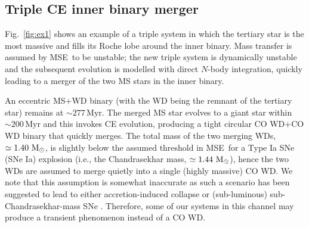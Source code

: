 \documentclass[twocolumn,appendixfloats,tighten]{aastex631}
\def\msun{{\rm\,M_\odot}}
\newcommand{\F}{Fig.}
\newcommand{\myr}{\mathrm{Myr}}
\newcommand{\mse}{\textsc{MSE}}
\begin{document}
\subsection{Triple CE inner binary merger}
\label{sect:ex:1}

\F~\ref{fig:ex1} shows an example of a triple system in which the tertiary star is the most massive and fills its Roche lobe around the inner binary. Mass transfer is assumed by \mse~to be unstable; the new triple system is dynamically unstable and the subsequent evolution is modelled with direct $N$-body integration, quickly leading to a merger of the two MS stars in the inner binary. 

\begin{figure*}
\iftoggle{ApJFigs}{
\texttt{[image: system\_2166\_mobile]}
}{
\texttt{[image: figs/system\_2166\_mobile]}
}
\caption{Mobile diagrams for a system in which unstable tertiary RLOF is followed by a merger in the inner binary system. The merged star, a new MS star, forms a tight binary with the tertiary star (now a WD). The latter evolves into a double WD system that merges into a single WD (the total WD mass before merger is just below the Chandrasekhar mass; a SNe Ia explosion is  assumed not to occur). When applicable, the current mutual inclination between the inner and outer orbits ($i_\mathrm{rel}$) is indicated. Note that the mobiles (black solid lines) are only shown for bound (sub)systems and when the code is in secular integration mode. Directly following (triple) CE, the code switches to direct $N$-body integration, in which case the orbital configuration may not be stable; stars are in this case depicted as in isolation (although they may be actually bound).}
\label{fig:ex1}
\end{figure*}

An eccentric MS+WD binary (with the WD being the remnant of the tertiary star) remains at $\sim 277\,\myr$. The merged MS star evolves to a giant star within $\sim 200\,\myr$ and this invokes CE evolution, producing a tight circular CO WD+CO WD binary that quickly merges. The total mass of the two merging WDs, $\simeq 1.40\,\msun$, is slightly below the assumed threshold in \mse~for a Type Ia SNe (SNe Ia) explosion (i.e., the Chandrasekhar mass, $\simeq 1.44\,\msun$), hence the two WDs are assumed to merge quietly into a single (highly massive) CO WD. We note that this assumption is somewhat inaccurate as such a scenario has been suggested to lead to either accretion-induced collapse \citep[e.g.,][]{2015MNRAS.453.1910S,2019MNRAS.484..698R,2020RAA....20..135W,2020MNRAS.494.3422L} or (sub-luminous) sub-Chandrasekhar-mass SNe \citep[e.g.,][]{2010ApJ...714L..52S,2012ApJ...747L..10P,2013ApJ...770L...8P,2021A&A...649A.155G}. Therefore, some of our systems in this channel may produce a transient phenomenon instead of a CO WD.
\end{document}
